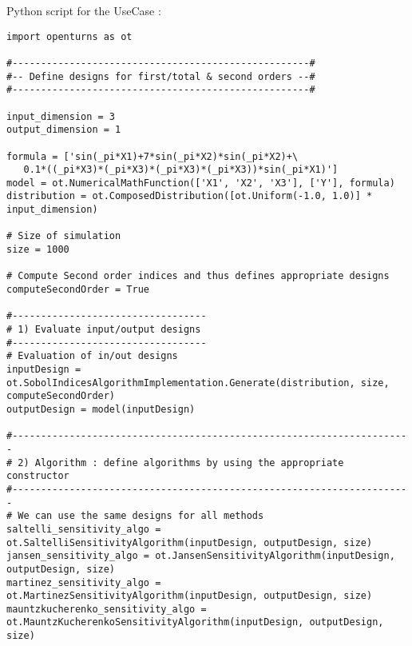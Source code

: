 Python script for the UseCase :

\begin{lstlisting}
import openturns as ot

#----------------------------------------------------#
#-- Define designs for first/total & second orders --#
#----------------------------------------------------#

input_dimension = 3
output_dimension = 1

formula = ['sin(_pi*X1)+7*sin(_pi*X2)*sin(_pi*X2)+\
   0.1*((_pi*X3)*(_pi*X3)*(_pi*X3)*(_pi*X3))*sin(_pi*X1)']
model = ot.NumericalMathFunction(['X1', 'X2', 'X3'], ['Y'], formula)
distribution = ot.ComposedDistribution([ot.Uniform(-1.0, 1.0)] * input_dimension)

# Size of simulation
size = 1000

# Compute Second order indices and thus defines appropriate designs
computeSecondOrder = True

#----------------------------------
# 1) Evaluate input/output designs
#----------------------------------
# Evaluation of in/out designs
inputDesign = ot.SobolIndicesAlgorithmImplementation.Generate(distribution, size, computeSecondOrder)
outputDesign = model(inputDesign)

#----------------------------------------------------------------------
# 2) Algorithm : define algorithms by using the appropriate constructor
#----------------------------------------------------------------------
# We can use the same designs for all methods
saltelli_sensitivity_algo = ot.SaltelliSensitivityAlgorithm(inputDesign, outputDesign, size)
jansen_sensitivity_algo = ot.JansenSensitivityAlgorithm(inputDesign, outputDesign, size)
martinez_sensitivity_algo = ot.MartinezSensitivityAlgorithm(inputDesign, outputDesign, size)
mauntzkucherenko_sensitivity_algo = ot.MauntzKucherenkoSensitivityAlgorithm(inputDesign, outputDesign, size)

\end{lstlisting}
